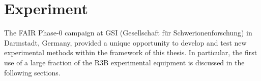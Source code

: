 \section{Experiment}
The FAIR Phase-0 campaign at GSI (Gesellschaft für Schwerionenforschung) in Darmstadt, Germany, provided a unique opportunity to develop and test new experimental methods within the framework of this thesis. In particular, the first use of a large fraction of the R3B experimental equipment is discussed in the following sections.
